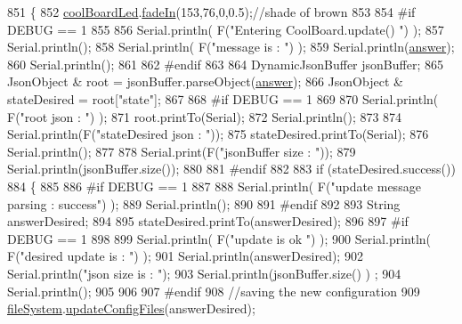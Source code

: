 \begin{DoxyCode}
851 \{
852     \hyperlink{classCoolBoard_a1b1d3c684a5baa56b08486e192fd8e97}{coolBoardLed}.\hyperlink{classCoolBoardLed_ab778f5e7bed0ab74e3906d82110493c3}{fadeIn}(153,76,0,0.5);\textcolor{comment}{//shade of brown        }
853 
854 \textcolor{preprocessor}{#if DEBUG == 1}
855 
856     Serial.println( F(\textcolor{stringliteral}{"Entering CoolBoard.update() "}) );
857     Serial.println();
858     Serial.println( F(\textcolor{stringliteral}{"message is : "}) );
859     Serial.println(\hyperlink{classCoolBoard_a7b835fafd449e5282f7f91d787a2dc15}{answer});
860     Serial.println();
861 
862 \textcolor{preprocessor}{#endif}
863 
864     DynamicJsonBuffer jsonBuffer;
865     JsonObject & root = jsonBuffer.parseObject(\hyperlink{classCoolBoard_a7b835fafd449e5282f7f91d787a2dc15}{answer});
866     JsonObject & stateDesired = root[\textcolor{stringliteral}{"state"}];
867 
868 \textcolor{preprocessor}{#if DEBUG == 1}
869 
870     Serial.println( F(\textcolor{stringliteral}{"root json : "}) );
871     root.printTo(Serial);
872     Serial.println();
873 
874     Serial.println(F(\textcolor{stringliteral}{"stateDesired json : "}));
875     stateDesired.printTo(Serial);
876     Serial.println();
877     
878     Serial.print(F(\textcolor{stringliteral}{"jsonBuffer size : "}));
879     Serial.println(jsonBuffer.size());
880 
881 \textcolor{preprocessor}{#endif}
882 
883     \textcolor{keywordflow}{if} (stateDesired.success())
884     \{
885     
886 \textcolor{preprocessor}{    #if DEBUG == 1}
887 
888         Serial.println( F(\textcolor{stringliteral}{"update message parsing : success"}) );
889         Serial.println();
890     
891 \textcolor{preprocessor}{    #endif}
892 
893             String answerDesired;
894         
895             stateDesired.printTo(answerDesired);
896             
897 \textcolor{preprocessor}{        #if DEBUG == 1      }
898         
899             Serial.println( F(\textcolor{stringliteral}{"update is ok "}) );
900             Serial.println( F(\textcolor{stringliteral}{"desired update is : "}) );            
901             Serial.println(answerDesired);
902             Serial.println(\textcolor{stringliteral}{"json size is : "});
903             Serial.println(jsonBuffer.size() ) ;                
904             Serial.println();
905 
906         
907 \textcolor{preprocessor}{        #endif}
908             \textcolor{comment}{//saving the new configuration}
909             \hyperlink{classCoolBoard_a42c2586fbb13ff7f06538e9284e8538d}{fileSystem}.\hyperlink{classCoolFileSystem_adfa8e2e80641ae6f0cceabd348a9b841}{updateConfigFiles}(answerDesired);

\end{DoxyCode}
